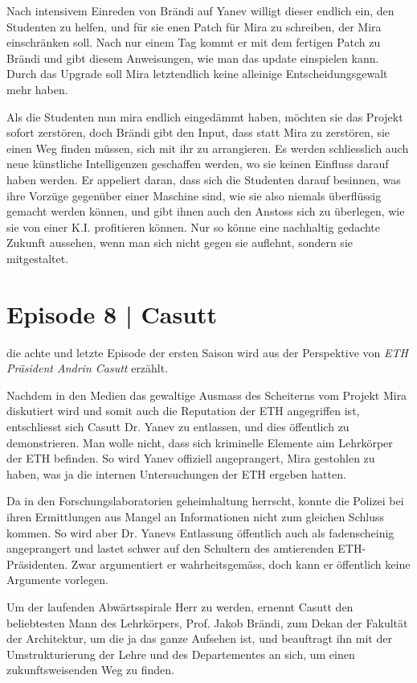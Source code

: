 \documentclass[11pt,a4paper,ngerman]{scrreprt}
\begin{document}
Nach intensivem Einreden von Brändi auf Yanev willigt dieser endlich ein, den
Studenten zu helfen, und für sie enen Patch für Mira zu schreiben, der Mira
einschränken soll. Nach nur einem Tag kommt er mit dem fertigen Patch zu Brändi
und gibt diesem Anweisungen, wie man das update einspielen kann. Durch das
Upgrade soll Mira letztendlich keine alleinige Entscheidungsgewalt mehr haben.

Als die Studenten nun mira endlich eingedämmt haben, möchten sie das Projekt
sofort zerstören, doch Brändi gibt den Input, dass statt Mira zu zerstören, sie
einen Weg finden müssen, sich mit ihr zu arrangieren. Es werden schliesslich
auch neue künstliche Intelligenzen geschaffen werden, wo sie keinen Einfluss
darauf haben werden. Er appeliert daran, dass sich die Studenten darauf
besinnen, was ihre Vorzüge gegenüber einer Maschine sind, wie sie also niemals
überflüssig gemacht werden können, und gibt ihnen auch den Anstoss sich zu
überlegen, wie sie von einer K.I. profitieren können. Nur so könne eine
nachhaltig gedachte Zukunft aussehen, wenn man sich nicht gegen sie auflehnt,
sondern sie mitgestaltet.

\section*{Episode 8 | Casutt}

die achte und letzte Episode der ersten Saison wird aus der Perspektive von \emph{ETH
Präsident Andrin Casutt} erzählt.

Nachdem in den Medien das gewaltige Ausmass des Scheiterns vom Projekt Mira
diskutiert wird und somit auch die Reputation der ETH angegriffen ist,
entschliesst sich Casutt Dr. Yanev zu entlassen, und dies öffentlich zu
demonstrieren. Man wolle nicht, dass sich kriminelle Elemente aim Lehrkörper der
ETH befinden. So wird Yanev offiziell angeprangert, Mira gestohlen zu haben, was
ja die internen Untersuchungen der ETH ergeben hatten.

Da in den Forschungslaboratorien geheimhaltung herrscht, konnte die Polizei bei
ihren Ermittlungen aus Mangel an Informationen nicht zum gleichen Schluss
kommen. So wird aber Dr. Yanevs Entlassung öffentlich auch als fadenscheinig
angeprangert und lastet schwer auf den Schultern des amtierenden
ETH-Präsidenten. Zwar argumentiert er wahrheitsgemäss, doch kann er öffentlich
keine Argumente vorlegen.

Um der laufenden Abwärtsspirale Herr zu werden, ernennt Casutt den
beliebtesten Mann des Lehrkörpers, Prof. Jakob Brändi, zum Dekan der Fakultät der
Architektur, um die ja das ganze Aufsehen ist, und beauftragt ihn mit der
Umstrukturierung der Lehre und des Departementes an sich, um einen
zukunftsweisenden Weg zu finden.
\end{document}
